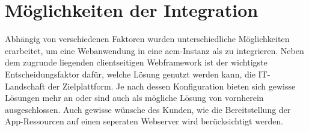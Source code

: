 \section{Möglichkeiten der Integration}
\label{sec:integrationen}
Abhängig von verschiedenen Faktoren wurden unterschiedliche Möglichkeiten erarbeitet, um eine Webanwendung in eine \ac{aem}-Instanz als \ajc zu integrieren. Neben dem zugrunde liegenden clientseitigen Webframework ist der wichtigste Entscheidungsfaktor dafür, welche Lösung genutzt werden kann, die IT-Landschaft der Zielplattform. Je nach dessen Konfiguration bieten sich gewisse Lösungen mehr an oder sind auch als mögliche Lösung von vornherein ausgeschlossen. Auch gewisse wünsche des Kunden, wie die Bereitstellung der App-Ressourcen auf einen seperaten Webserver wird berücksichtigt werden.





